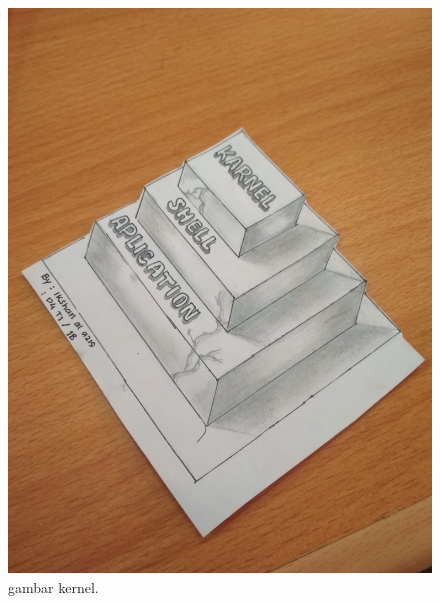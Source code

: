 	\begin{figure}[ht]
		\centerline{\includegraphics[width=1\textwidth]{figures/Kernel.jpg}}
		\caption{gambar kernel.}
		\label{kernel}
	\end{figure}

